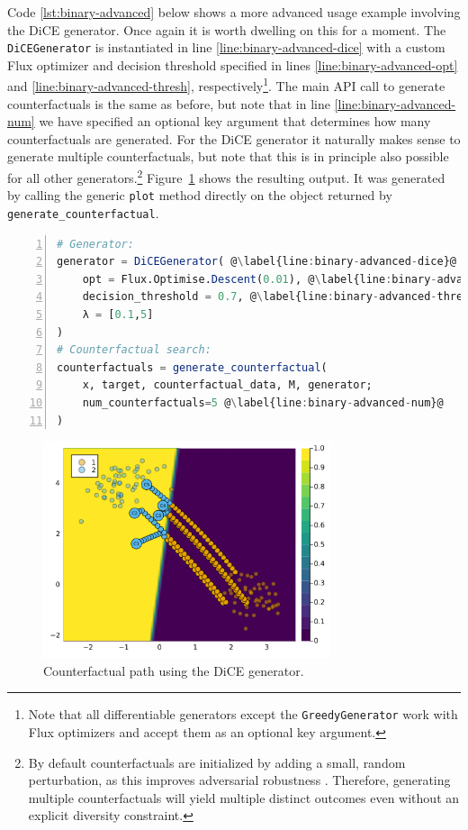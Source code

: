 \documentclass{juliacon}
\begin{document}
Code \ref{lst:binary-advanced} below shows a more advanced usage example
involving the DiCE generator. Once again it is worth dwelling on this
for a moment. The \texttt{DiCEGenerator} is instantiated in line
\ref{line:binary-advanced-dice} with a custom Flux optimizer and
decision threshold specified in lines \ref{line:binary-advanced-opt} and
\ref{line:binary-advanced-thresh}, respectively\footnote{Note that all
  differentiable generators except the \texttt{GreedyGenerator} work
  with Flux optimizers and accept them as an optional key argument.}.
The main API call to generate counterfactuals is the same as before, but
note that in line \ref{line:binary-advanced-num} we have specified an
optional key argument that determines how many counterfactuals are
generated. For the DiCE generator it naturally makes sense to generate
multiple counterfactuals, but note that this is in principle also
possible for all other generators.\footnote{By default counterfactuals
  are initialized by adding a small, random perturbation, as this
  improves adversarial robustness \cite{slack2021counterfactual}.
  Therefore, generating multiple counterfactuals will yield multiple
  distinct outcomes even without an explicit diversity constraint.}
Figure~\ref{fig-binary-advanced} shows the resulting output. It was
generated by calling the generic \texttt{plot} method directly on the
object returned by \texttt{generate\_counterfactual}.

\begin{lstlisting}[language=Julia, escapechar=@, numbers=left, label={lst:binary-advanced}, caption={Using the DiCE generator.}]
# Generator:
generator = DiCEGenerator( @\label{line:binary-advanced-dice}@
    opt = Flux.Optimise.Descent(0.01), @\label{line:binary-advanced-opt}@
    decision_threshold = 0.7, @\label{line:binary-advanced-thresh}@
    λ = [0.1,5]
)
# Counterfactual search:
counterfactuals = generate_counterfactual(
    x, target, counterfactual_data, M, generator;
    num_counterfactuals=5 @\label{line:binary-advanced-num}@
)
\end{lstlisting}

\begin{figure}

{\centering \includegraphics[width=3.33333in,height=2.5in]{www/binary_advanced.png}

}

\caption{\label{fig-binary-advanced}Counterfactual path using the DiCE
generator.}

\end{figure}
\end{document}
